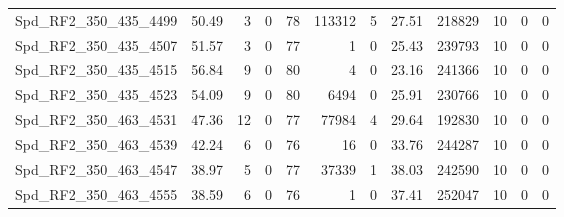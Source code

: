 \begin{longtable}[c]{@{}lrrrrrrrrrrr@{}}
Spd\_RF2\_350\_435\_4499      & 50.49                  & 3                       & 0                       & 78                     & 113312                  & 5                       & 27.51                   & 218829                   & 10                       & 0                        & 0                        \\
Spd\_RF2\_350\_435\_4507      & 51.57                  & 3                       & 0                       & 77                     & 1                       & 0                       & 25.43                   & 239793                   & 10                       & 0                        & 0                        \\
Spd\_RF2\_350\_435\_4515      & 56.84                  & 9                       & 0                       & 80                     & 4                       & 0                       & 23.16                   & 241366                   & 10                       & 0                        & 0                        \\
Spd\_RF2\_350\_435\_4523      & 54.09                  & 9                       & 0                       & 80                     & 6494                    & 0                       & 25.91                   & 230766                   & 10                       & 0                        & 0                        \\
Spd\_RF2\_350\_463\_4531      & 47.36                  & 12                      & 0                       & 77                     & 77984                   & 4                       & 29.64                   & 192830                   & 10                       & 0                        & 0                        \\
Spd\_RF2\_350\_463\_4539      & 42.24                  & 6                       & 0                       & 76                     & 16                      & 0                       & 33.76                   & 244287                   & 10                       & 0                        & 0                        \\
Spd\_RF2\_350\_463\_4547      & 38.97                  & 5                       & 0                       & 77                     & 37339                   & 1                       & 38.03                   & 242590                   & 10                       & 0                        & 0                        \\
Spd\_RF2\_350\_463\_4555      & 38.59                  & 6                       & 0                       & 76                     & 1                       & 0                       & 37.41                   & 252047                   & 10                       & 0                        & 0                        \\

\end{longtable}
